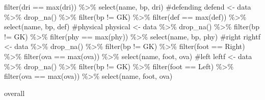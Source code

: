 \documentclass[
  letterpaper,
  DIV=11,
  numbers=noendperiod]{scrartcl}
\newenvironment{Shaded}{\begin{snugshade}}{\end{snugshade}}
\newcommand{\CommentTok}[1]{\textcolor[rgb]{0.37,0.37,0.37}{#1}}
\newcommand{\FunctionTok}[1]{\textcolor[rgb]{0.28,0.35,0.67}{#1}}
\newcommand{\NormalTok}[1]{\textcolor[rgb]{0.00,0.23,0.31}{#1}}
\newcommand{\OtherTok}[1]{\textcolor[rgb]{0.00,0.23,0.31}{#1}}
\newcommand{\SpecialCharTok}[1]{\textcolor[rgb]{0.37,0.37,0.37}{#1}}
\newcommand{\StringTok}[1]{\textcolor[rgb]{0.13,0.47,0.30}{#1}}
\begin{document}
\begin{Shaded}
\begin{Highlighting}[]
  \FunctionTok{filter}\NormalTok{(dri }\SpecialCharTok{==} \FunctionTok{max}\NormalTok{(dri)) }\SpecialCharTok{\%\textgreater{}\%} 
  \FunctionTok{select}\NormalTok{(name, bp, dri)}
\CommentTok{\#defending }
\NormalTok{defend }\OtherTok{\textless{}{-}}\NormalTok{ data }\SpecialCharTok{\%\textgreater{}\%} 
  \FunctionTok{drop\_na}\NormalTok{() }\SpecialCharTok{\%\textgreater{}\%} 
  \FunctionTok{filter}\NormalTok{(bp }\SpecialCharTok{!=} \StringTok{\textquotesingle{}GK\textquotesingle{}}\NormalTok{) }\SpecialCharTok{\%\textgreater{}\%} 
  \FunctionTok{filter}\NormalTok{(def }\SpecialCharTok{==} \FunctionTok{max}\NormalTok{(def)) }\SpecialCharTok{\%\textgreater{}\%} 
  \FunctionTok{select}\NormalTok{(name, bp, def)}
\CommentTok{\#physical}
\NormalTok{physical }\OtherTok{\textless{}{-}}\NormalTok{ data }\SpecialCharTok{\%\textgreater{}\%} 
  \FunctionTok{drop\_na}\NormalTok{() }\SpecialCharTok{\%\textgreater{}\%} 
  \FunctionTok{filter}\NormalTok{(bp }\SpecialCharTok{!=} \StringTok{\textquotesingle{}GK\textquotesingle{}}\NormalTok{) }\SpecialCharTok{\%\textgreater{}\%} 
  \FunctionTok{filter}\NormalTok{(phy }\SpecialCharTok{==} \FunctionTok{max}\NormalTok{(phy)) }\SpecialCharTok{\%\textgreater{}\%} 
  \FunctionTok{select}\NormalTok{(name, bp, phy)}
\CommentTok{\#right}
\NormalTok{rightf }\OtherTok{\textless{}{-}}\NormalTok{ data }\SpecialCharTok{\%\textgreater{}\%} 
  \FunctionTok{drop\_na}\NormalTok{() }\SpecialCharTok{\%\textgreater{}\%}
  \FunctionTok{filter}\NormalTok{(bp }\SpecialCharTok{!=} \StringTok{\textquotesingle{}GK\textquotesingle{}}\NormalTok{) }\SpecialCharTok{\%\textgreater{}\%} 
  \FunctionTok{filter}\NormalTok{(foot }\SpecialCharTok{==} \StringTok{\textquotesingle{}Right\textquotesingle{}}\NormalTok{) }\SpecialCharTok{\%\textgreater{}\%} 
  \FunctionTok{filter}\NormalTok{(ova }\SpecialCharTok{==} \FunctionTok{max}\NormalTok{(ova)) }\SpecialCharTok{\%\textgreater{}\%} 
  \FunctionTok{select}\NormalTok{(name, foot, ova)}
\CommentTok{\#left}
\NormalTok{leftf }\OtherTok{\textless{}{-}}\NormalTok{ data }\SpecialCharTok{\%\textgreater{}\%} 
  \FunctionTok{drop\_na}\NormalTok{() }\SpecialCharTok{\%\textgreater{}\%}
  \FunctionTok{filter}\NormalTok{(bp }\SpecialCharTok{!=} \StringTok{\textquotesingle{}GK\textquotesingle{}}\NormalTok{) }\SpecialCharTok{\%\textgreater{}\%} 
  \FunctionTok{filter}\NormalTok{(foot }\SpecialCharTok{==} \StringTok{\textquotesingle{}Left\textquotesingle{}}\NormalTok{) }\SpecialCharTok{\%\textgreater{}\%} 
  \FunctionTok{filter}\NormalTok{(ova }\SpecialCharTok{==} \FunctionTok{max}\NormalTok{(ova)) }\SpecialCharTok{\%\textgreater{}\%} 
  \FunctionTok{select}\NormalTok{(name, foot, ova)}

\NormalTok{overall}
\end{Highlighting}
\end{Shaded}
\end{document}

